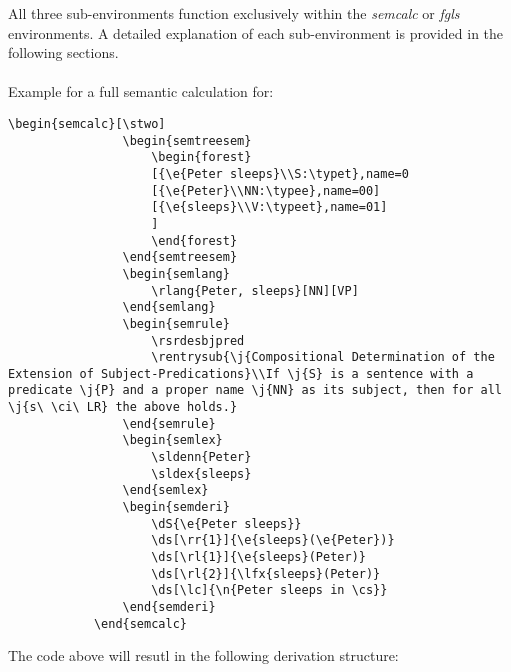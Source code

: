 \documentclass[10pt, a4paper]{article}
\begin{document}
	All three sub-environments function exclusively within the \textit{semcalc} or \textit{fgls} environments. A detailed explanation of each sub-environment is provided in the following sections.
	\\\ \\Example for a full semantic calculation for: 
	\begin{lstlisting}[style=B]
			\begin{semcalc}[\stwo]
				\begin{semtreesem}
					\begin{forest}
					[{\e{Peter sleeps}\\S:\typet},name=0
					[{\e{Peter}\\NN:\typee},name=00]
					[{\e{sleeps}\\V:\typeet},name=01]
					]
					\end{forest}
				\end{semtreesem}
				\begin{semlang}
					\rlang{Peter, sleeps}[NN][VP]
				\end{semlang}
				\begin{semrule}
					\rsrdesbjpred
					\rentrysub{\j{Compositional Determination of the Extension of Subject-Predications}\\If \j{S} is a sentence with a predicate \j{P} and a proper name \j{NN} as its subject, then for all \j{s\ \ci\ LR} the above holds.}
				\end{semrule}
				\begin{semlex}
					\sldenn{Peter}
					\sldex{sleeps}
				\end{semlex}
				\begin{semderi}
					\dS{\e{Peter sleeps}}
					\ds[\rr{1}]{\e{sleeps}(\e{Peter})}
					\ds[\rl{1}]{\e{sleeps}(Peter)}
					\ds[\rl{2}]{\lfx{sleeps}(Peter)}
					\ds[\lc]{\n{Peter sleeps in \cs}}
				\end{semderi}
			\end{semcalc}
	\end{lstlisting}
	\newpage
	The code above will resutl in the following derivation structure:
\end{document}

